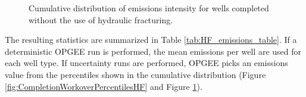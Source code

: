 \documentclass[11pt]{report}
\begin{document}
\begin{figure}[tb]
\begin{center}
\hfill
{}
\hfill
\caption{Cumulative distribution of emissions intensity for wells completed without the use of hydraulic fracturing.}
\label{fig:CompletionWorkoverPercentilesNHF}
\end{center}
\end{figure}

The resulting statistics are summarized in Table \ref{tab:HF_emissions_table}. If a deterministic OPGEE run is performed, the mean emissions per well are used for each well type. If uncertainty runs are performed, OPGEE picks an emissions value from the percentiles shown in the cumulative distribution (Figure \ref{fig:CompletionWorkoverPercentilesHF} and Figure \ref{fig:CompletionWorkoverPercentilesNHF}).
\end{document}
